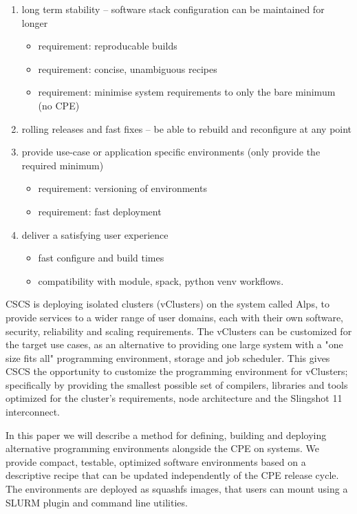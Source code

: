 \begin{enumerate}
    \item long term stability -- software stack configuration can be maintained for longer
    \begin{itemize}
        \item requirement: reproducable builds
        \item requirement: concise, unambiguous recipes
        \item requirement: minimise system requirements to only the bare minimum (no CPE)
    \end{itemize}
    \item rolling releases and fast fixes -- be able to rebuild and reconfigure at any point
    \item provide use-case or application specific environments (only provide the required minimum)
    \begin{itemize}
        \item requirement: versioning of environments
        \item requirement: fast deployment
    \end{itemize}
    \item deliver a satisfying user experience
    \begin{itemize}
        \item fast configure and build times
        \item compatibility with module, spack, python venv workflows.
    \end{itemize}
\end{enumerate}

CSCS is deploying isolated clusters (vClusters) on the \crayex system called Alps, to provide services to a wider range of user domains, each with their own software, security, reliability and scaling requirements.
The vClusters can be customized for the target use cases, as an alternative to providing one large system with a "one size fits all" programming environment, storage and job scheduler.
This gives CSCS the opportunity to customize the programming environment for vClusters; specifically by providing the smallest possible set of compilers, libraries and tools optimized for the cluster's requirements, node architecture and the Slingshot 11 interconnect.

In this paper we will describe a method for defining, building and deploying alternative programming environments alongside the CPE on \crayex systems.
We provide compact, testable, optimized software environments based on a descriptive recipe that can be updated independently of the CPE release cycle.
The environments are deployed as squashfs images, that users can mount using a SLURM plugin and command line utilities.


